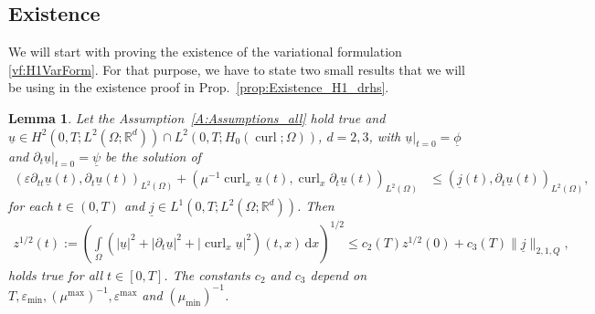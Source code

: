 \documentclass[a4paper,11pt]{article}
\newtheorem{lem}[thm]{Lemma}
\newcommand{\R}{\mathbb R}
\newcommand{\cu}{\operatorname{curl}}
\renewcommand{\vec}[1]{\underline{#1}}
\newcommand{\abs}[1]{\left\lvert{#1}\right\rvert}
\begin{document}
\subsection{Existence}
We will start with proving the existence of the variational formulation \eqref{vf:H1VarForm}. For that purpose, we have to state two small results that we will be using in the existence proof in Prop.~\ref{prop:Existence_H1_drhs}.
\begin{lem}\label{lem:H2_ungl_not_var} 
	Let the Assumption~\ref{A:Assumptions_all} hold true and $\vec u\in  H^2(0,T;L^2(\Omega;\R^d))\cap L^2(0,T;H_0(\cu;\Omega))$, $d=2,3$, with	$\vec u|_{t=0} =  \vec \phi$ and $\partial_t \vec  u|_{t=0} =\vec \psi$ be the solution of
	 \begin{align}\label{ieqn:sec_order}
			\left(\varepsilon\partial_{tt}\vec u(t),\partial_t \vec u(t)\right)_{L^2(\Omega)}+\left(\mu^{-1}\cu_x \vec u(t), \cu_x\partial_t \vec u(t)\right)_{L^2(\Omega)}& \leq  \left( \vec j(t), \partial_t\vec u(t)\right)_{L^2(\Omega)},
		\end{align}	 
		for each $t\in(0,T)$ and $\vec j\in L^{1}(0,T;L^2(\Omega;\R^d))$. Then 
	\begin{align*}
		z^{1/2}(t) := \left(\int\limits_{\Omega}\left(\abs{\vec u}^2+\abs{\partial_t \vec u}^2 +\abs{\cu_x \vec u}^2\right)(t,x)\,\mathrm dx\right)^{1/2} \leq c_2(T) z^{1/2}(0)+c_3(T) \|\vec j\|_{2,1,Q},
	\end{align*}
	holds true for all  $t\in [0,T]$. The constants $c_2$ and $c_3$ depend on  $T, \varepsilon_{\min},(\mu^{\max})^{-1},\varepsilon^{\max}$ and $(\mu_{\min})^{-1}$.
\end{lem}
\end{document}
